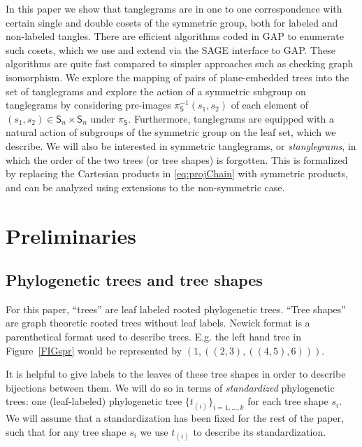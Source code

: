\documentclass{amsart}
\newcommand{\fS}{\mathfrak S}
\newcommand{\shape}{\mathsf{S}}
\begin{document}
In this paper we show that tanglegrams are in one to one correspondence with certain single and double cosets of the symmetric group, both for labeled and non-labeled tangles.
There are efficient algorithms coded in GAP \cite{GAP4} to enumerate such cosets, which we use and extend via the SAGE \cite{SteinJoyner2005} interface to GAP.
These algorithms are quite fast compared to simpler approaches such as checking graph isomorphism.
We explore the mapping of pairs of plane-embedded trees into the set of tanglegrams and explore the action of a symmetric subgroup on tanglegrams by considering pre-images $\pi_\shape^{-1}(s_1, s_2)$ of each element of $(s_1, s_2) \in \shape_n \times \shape_n$ under $\pi_\shape$.
Furthermore, tanglegrams are equipped with a natural action of subgroups of the symmetric group on the leaf set, which we describe.
We will also be interested in symmetric tanglegrams, or \emph{stanglegrams}, in which the order of the two trees (or tree shapes) is forgotten.
This is formalized by replacing the Cartesian products in \eqref{eq:projChain} with symmetric products, and can be analyzed using extensions to the non-symmetric case.


\section{Preliminaries}

\subsection{Phylogenetic trees and tree shapes}
For this paper, ``trees'' are leaf labeled rooted phylogenetic trees.
``Tree shapes'' are graph theoretic rooted trees without leaf labels.
Newick format is a parenthetical format used to describe trees. E.g. the left hand tree in Figure~\ref{FIGspr} would be represented by $(1,((2,3),((4,5),6)))$.

It is helpful to give labels to the leaves of these tree shapes in order to describe bijections between them.
We will do so in terms of \emph{standardized} phylogenetic trees: one (leaf-labeled) phylogenetic tree $\{t_{(i)}\}_{i=1,\ldots,k}$ for each tree shape $s_i$.
We will assume that a standardization has been fixed for the rest of the paper, such that for any tree shape $s_i$ we use $t_{(i)}$ to describe its standardization.

\end{document}
